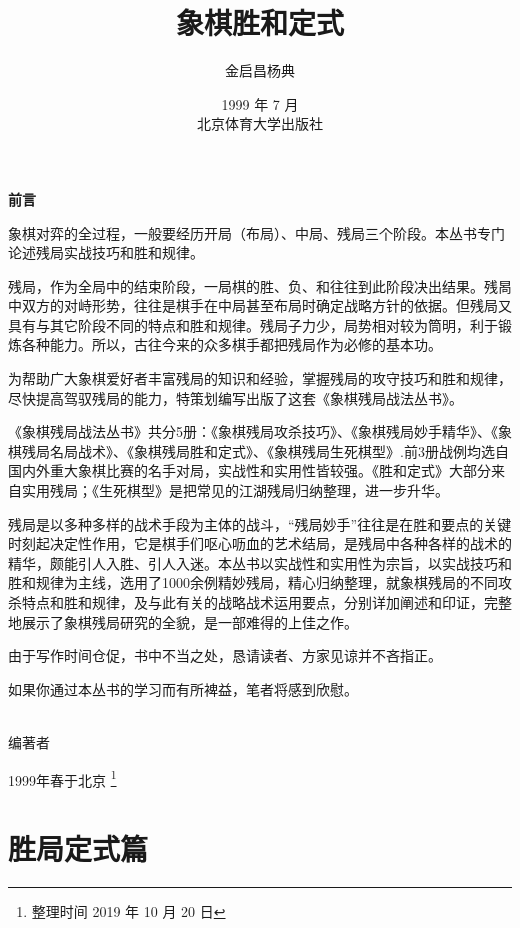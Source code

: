 \documentclass[UTF8]{ctexbook}
\title{象棋胜和定式}
\author{金启昌\quad 杨\quad 典}
\date{1999 年 7 月  \\ \vspace{14cm} 北京体育大学出版社
}
\begin{document}
\maketitle

\thispagestyle{empty}
\begin{center}
{\textbf{前言} }
\end{center}
\vspace{3cm}

象棋对弈的全过程，一般要经历开局（布局）、中局、残局三个阶段。本丛书专门论述残局实战技巧和胜和规律。

残局，作为全局中的结束阶段，一局棋的胜、负、和往往到此阶段决出结果。残晑中双方的对峙形势，往往是棋手在中局甚至布局时确定战略方针的依据。但残局又具有与其它阶段不同的特点和胜和规律。残局子力少，局势相对较为筒明，利于锻炼各种能力。所以，古往今来的众多棋手都把残局作为必修的基本功。

为帮助广大象棋爱好者丰富残局的知识和经验，掌握残局的攻守技巧和胜和规律，尽快提高驾驭残局的能力，特策划编写出版了这套《象棋残局战法丛书》。

《象棋残局战法丛书》共分5册：《象棋残局攻杀技巧》、《象棋残局妙手精华》、《象棋残局名局战术》、《象棋残局胜和定式》、《象棋残局生死棋型》.前3册战例均选自国内外重大象棋比赛的名手对局，实战性和实用性皆较强。《胜和定式》大部分来自实用残局；《生死棋型》是把常见的江湖残局归纳整理，进一步升华。

残局是以多种多样的战术手段为主体的战斗，“残局妙手”往往是在胜和要点的关键时刻起决定性作用，它是棋手们呕心呖血的艺术结局，是残局中各种各样的战术的精华，颇能引人入胜、引人入迷。本丛书以实战性和实用性为宗旨，以实战技巧和胜和规律为主线，选用了1000余例精妙残局，精心归纳整理，就象棋残局的不同攻杀特点和胜和规律，及与此有关的战略战术运用要点，分别详加阐述和印证，完整地展示了象棋残局研究的全貌，是一部难得的上佳之作。

由于写作时间仓促，书中不当之处，恳请读者、方家见谅并不吝指正。

如果你通过本丛书的学习而有所裨益，笔者将感到欣慰。

~\\

编著者

1999年春于北京 \footnote{整理时间 2019 年 10 月 20 日}


\clearpage
\tableofcontents
\thispagestyle{empty}


\clearpage
\chapter{胜局定式篇}
\setcounter{page}{1}
\end{document}
